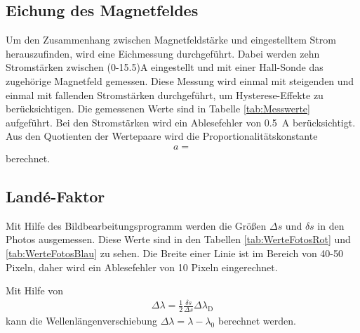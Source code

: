 \subsection{Eichung des Magnetfeldes}
Um den Zusammenhang zwischen Magnetfeldstärke und eingestelltem Strom herauszufinden, wird eine Eichmessung durchgeführt. Dabei werden zehn Stromstärken zwischen (0-15.5)\si{\ampere} eingestellt und mit einer Hall-Sonde das zugehörige Magnetfeld gemessen. Diese Messung wird einmal mit steigenden und einmal mit fallenden Stromstärken durchgeführt, um Hysterese-Effekte zu berücksichtigen. Die gemessenen Werte sind in Tabelle \ref{tab:Messwerte} aufgeführt. Bei den Stromstärken wird ein Ablesefehler von \SI{0.5}{\ampere} berücksichtigt. Aus den Quotienten der Wertepaare wird die Proportionalitätskonstante 
\begin{align}
	a = 
\end{align}
berechnet.


\subsection{Landé-Faktor}
Mit Hilfe des Bildbearbeitungsprogramm werden die Größen $\Delta s$ und $\delta s$ in den Photos ausgemessen. Diese Werte sind in den Tabellen \ref{tab:WerteFotosRot} und \ref{tab:WerteFotosBlau} zu sehen. Die Breite einer Linie ist im Bereich von 40-50 Pixeln, daher wird ein Ablesefehler von 10 Pixeln eingerechnet.


Mit Hilfe von
\begin{align}
	\Delta\lambda = \frac{1}{2}\frac{\delta s}{\Delta s}\Delta\lambda_\text{D}
\end{align}
kann die Wellenlängenverschiebung $\Delta\lambda = \lambda - \lambda_0$ berechnet werden.

